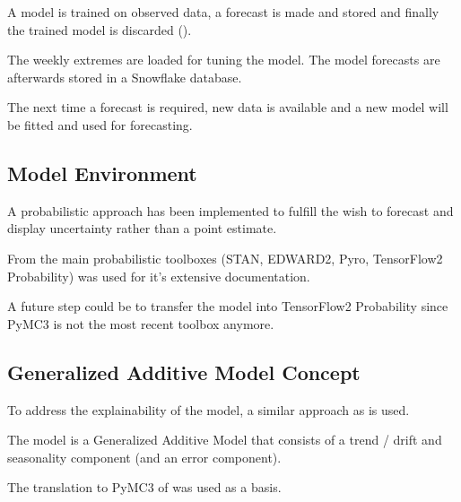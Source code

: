 \documentclass[letterpaper,10pt,english]{sphinxmanual}
\let\sphinxpxdimen\pdfpxdimen\else\newdimen\sphinxpxdimen
\begin{document}
A model is trained on observed data, a forecast is made and stored and finally the trained model is discarded ({\hyperref[\detokenize{autoapi/src/forecast/forecast/index:src.forecast.forecast.forecast}]{}}).

\noindent{\hspace*{\fill}\sphinxincludegraphics[height=250\sphinxpxdimen]{{process_modeling}.png}\hspace*{\fill}}

The weekly extremes are loaded for tuning the model. The model forecasts are afterwards stored in a Snowflake database.

The next time a forecast is required, new data is available and a new model will be fitted and used for forecasting.


\subsection{Model Environment}
\label{\detokenize{modeling:model-environment}}
A probabilistic approach has been implemented to fulfill the wish to forecast and display uncertainty rather than a point estimate.

From the main probabilistic toolboxes (STAN, EDWARD2, Pyro, TensorFlow2 Probability)  was used for it’s extensive documentation.

A future step could be to transfer the model into TensorFlow2 Probability since PyMC3 is not the most recent toolbox anymore.


\subsection{Generalized Additive Model Concept}
\label{\detokenize{modeling:generalized-additive-model-concept}}
To address the explainability of the model, a similar approach as  is used.

The model is a Generalized Additive Model  that consists of a trend / drift and seasonality component (and an error component).

The translation to PyMC3 of  was used as a basis.
\end{document}
